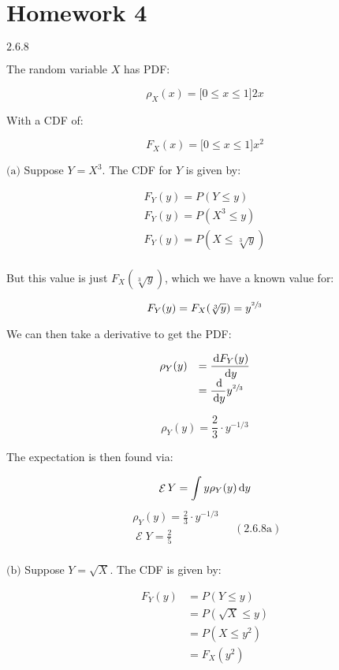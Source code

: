 \documentclass{article}
\newcommand{\problem}[2]{$\boxed{\text{#1.#2}}$}
\newcommand{\subproblem}[3]{$\boxed{\text{(#3)}}$}
\newcommand{\subsolution}[4]{\boxed{#4\quad(\text{#1.#2#3})}}
\renewcommand{\d}[1]{\,\textnormal{d}#1}
\newcommand{\ddd}[2]{\dfrac{\d{#1}}{\d{#2}}}
\DeclareMathOperator{\E}{\mathcal{E}}
\begin{document}
\section*{Homework 4}

%
\problem{2.6}{8}

The random variable $X$ has PDF:

\[
\rho_X(x)=\lbrack0\le x\le1\rbrack2x
\]

With a CDF of:

\[
F_X(x)=\lbrack0\le x\le1\rbrack x^2
\]

%
\subproblem{2.6}{8}{a} Suppose $Y=X^3$. The CDF for $Y$ is given by:

\[
\begin{array}{l}
F_Y(y)=P(Y\le y) \\
F_Y(y)=P(X^3\le y) \\
F_Y(y)=P(X\le \sqrt[3]{y}) \\
\end{array}
\]

But this value is just $F_X(\sqrt[3]{y})$, which we have a known value
for:

\[
F_Y(y)=F_X(\sqrt[3]{y})=y^{\sfrac{2}{3}}
\]

We can then take a derivative to get the PDF:

\[
\begin{array}{ll}
\rho_Y(y) &=\ddd{F_Y(y)}{y} \\
&=\ddd{}{y} y^{\sfrac{2}{3}} \\
\end{array}
\]

\[
\rho_Y(y)=\frac{2}{3}\cdot y^{-1/3}
\]

The expectation is then found via:

\[
\E Y=\int y \rho_Y(y)\d{y}
\] \[
\subsolution{2.6}{8}{a}{\begin{array}{l}
\rho_Y(y)=\frac{2}{3}\cdot y^{-1/3} \\
\E Y=\frac{2}{5} \\
\end{array}}
\]

%
\subproblem{2.6}{8}{b} Suppose $Y=\sqrt{X}$. The CDF is given by:

\[
\begin{array}{ll}
F_Y(y)&=P(Y\le y) \\
&=P(\sqrt{X}\le y) \\
&=P(X\le y^2) \\
&=F_X(y^2) \\
\end{array}
\]
\end{document}

